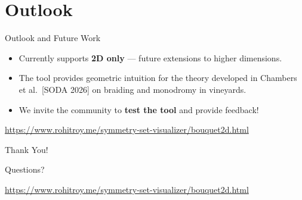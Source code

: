 \documentclass[
	11pt, %
]{beamer}
\begin{document}

\section{Outlook}

\begin{frame}{Outlook and Future Work}
    \begin{itemize}
        \item Currently supports \textbf{2D only} --- future extensions to higher dimensions.
        \pause
        \item The tool provides geometric intuition for the theory developed in Chambers et al.\ [SODA 2026] on braiding and monodromy in vineyards.
        \pause
        \item We invite the community to \textbf{test the tool} and provide feedback!
    \end{itemize}

    \bigskip
    \centering
    \Large
    \url{https://www.rohitroy.me/symmetry-set-visualizer/bouquet2d.html}
\end{frame}


\begin{frame}[plain]
	\begin{center}
		{\Huge Thank You!}

		\bigskip\bigskip

		{\LARGE Questions?}

        \bigskip

        \normalsize
        \url{https://www.rohitroy.me/symmetry-set-visualizer/bouquet2d.html}
	\end{center}
\end{frame}

\end{document}
